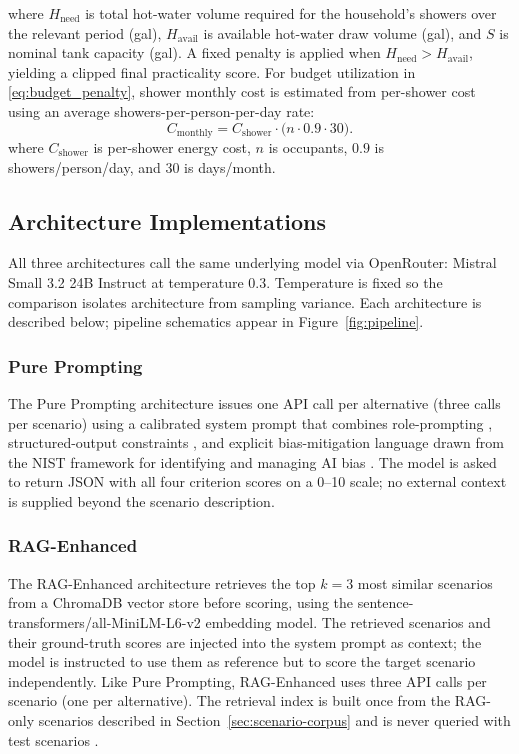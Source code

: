 \documentclass[final,3p,times]{elsarticle}
\begin{document}
\noindent where $H_{\mathrm{need}}$ is total hot-water volume required for the household's showers over the relevant period (gal),
$H_{\mathrm{avail}}$ is available hot-water draw volume (gal), and $S$ is nominal tank capacity (gal).
A fixed penalty is applied when $H_{\mathrm{need}}>H_{\mathrm{avail}}$, yielding a clipped
final practicality score.
For budget utilization in \eqref{eq:budget_penalty}, shower monthly cost is estimated from
per-shower cost using an average showers-per-person-per-day rate:
\begin{equation}
  C_{\mathrm{monthly}} = C_{\mathrm{shower}} \cdot \bigl(n \cdot 0.9 \cdot 30\bigr).
  \label{eq:shower_monthly_cost}
\end{equation}
\noindent where $C_{\mathrm{shower}}$ is per-shower energy cost, $n$ is occupants, $0.9$ is showers/person/day, and $30$ is days/month.

\subsection{Architecture Implementations}
\label{sec:architectures}

All three architectures call the same underlying model via OpenRouter: Mistral Small 3.2 24B Instruct at temperature 0.3. Temperature is fixed so the comparison isolates architecture from sampling variance. Each architecture is described below; pipeline schematics appear in Figure~\ref{fig:pipeline}.

\subsubsection{Pure Prompting}
The Pure Prompting architecture issues one API call per alternative (three calls per scenario) using a calibrated system prompt that combines role-prompting \cite{shanahan2023}, structured-output constraints \cite{wei2022cot}, and explicit bias-mitigation language drawn from the NIST framework for identifying and managing AI bias \cite{nistsp1270}. The model is asked to return JSON with all four criterion scores on a 0--10 scale; no external context is supplied beyond the scenario description.

\subsubsection{RAG-Enhanced}
The RAG-Enhanced architecture retrieves the top $k=3$ most similar scenarios from a ChromaDB vector store before scoring, using the sentence-transformers/all-MiniLM-L6-v2 embedding model. The retrieved scenarios and their ground-truth scores are injected into the system prompt as context; the model is instructed to use them as reference but to score the target scenario independently. Like Pure Prompting, RAG-Enhanced uses three API calls per scenario (one per alternative). The retrieval index is built once from the RAG-only scenarios described in Section~\ref{sec:scenario-corpus} and is never queried with test scenarios \cite{lewis2020}.
\end{document}
